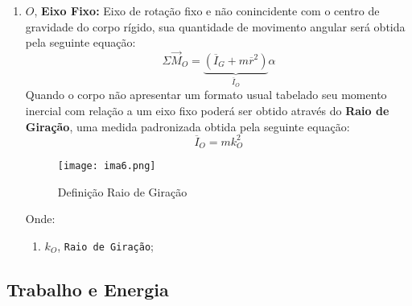 \documentclass{article}
\begin{document}
\begin{enumerate}[rightmargin = \leftmargin]
                    \item $O$, \textbf{Eixo Fixo:} Eixo de rotação fixo e não conincidente com o centro de gravidade do corpo rígido, sua quantidade de movimento angular será obtida pela seguinte equação:
                        \begin{equation}
                            \boxed{
                                \Sigma\vec{M}_{O} = 
                                \underbrace{
                                    (\overline{I}_{G} + m\overline{r}^{2})
                                }_{\overline{I}_{O}}
                                \alpha
                            }
                        \end{equation}
                    Quando o corpo não apresentar um formato usual tabelado seu momento inercial com relação a um eixo fixo poderá ser obtido através do \textbf{Raio de Giração}, uma medida padronizada obtida pela seguinte equação:
                        \begin{equation}
                            \boxed{
                                \overline{I}_{O} = 
                                m k^{2}_{O}
                            }
                        \end{equation}
                        \begin{figure}[H]
                            \centering
                            \texttt{[image: ima6.png]}
                            \caption{Definição Raio de Giração}
                        \end{figure}\noindent
                    Onde:
                        \begin{enumerate}[rightmargin = \leftmargin, noitemsep]
                            \item $k_{O}$, \texttt{Raio de Giração};
                        \end{enumerate}
                \end{enumerate}

        \subsection{Trabalho e Energia}
\end{document}
